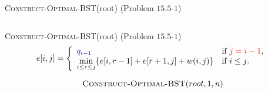 
\begin{frame}
  \begin{exampleblock}{\textsc{Construct-Optimal-BST}(root) (Problem $15.5$-$1$)}
    \begin{columns}
    \end{columns}
  \end{exampleblock}

  \pause
  \vspace{0.30cm}
  \begin{center}
  \end{center}
\end{frame}

\begin{frame}
  \begin{exampleblock}{\textsc{Construct-Optimal-BST}(root) (Problem $15.5$-$1$)}
    \[ 
      e[i,j] = \left\{ \begin{array}{ll}
	\textcolor{blue}{q_{i-1}} 	& \mbox{if \textcolor{red}{$j = i-1$}}, \\
	\min\limits_{i \le \textcolor{purple}{r} \le j} \{e[i, r-1] + e[r+1, j] + w(i,j) \}    & \mbox{if $i \le j$}.
      \end{array} \right. 
    \] 
  \end{exampleblock}

  \pause
  

  \pause
  \vspace{-0.50cm}
  \[
    \textsc{Construct-Optimal-BST}(root, 1, n)
  \]
\end{frame}

\begin{frame}
  
\end{frame}
